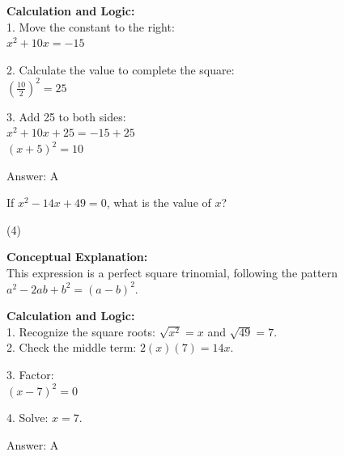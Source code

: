 \documentclass[11pt,paper=a4,answers]{exam}
\begin{document}
\begin{questions}
\begin{solution}
\textbf{Calculation and Logic:} \\
1. Move the constant to the right: \\
   $x^2 + 10x = -15$

\vspace{10pt}

2. Calculate the value to complete the square: \\
   $(\frac{10}{2})^2 = 25$

\vspace{10pt}

3. Add 25 to both sides: \\
   $x^2 + 10x + 25 = -15 + 25$ \\
   $(x + 5)^2 = 10$

\vspace{20pt}

Answer: \colorbox{yellow!100}{A}
\end{solution}

\vspace{30pt}

\question
If $x^2 - 14x + 49 = 0$, what is the value of $x$?
\begin{tasks}(4)
\end{tasks}

\begin{solution}
\textbf{Conceptual Explanation:} \\
This expression is a perfect square trinomial, following the pattern $a^2 - 2ab + b^2 = (a - b)^2$.

\vspace{15pt}

\textbf{Calculation and Logic:} \\
1. Recognize the square roots: $\sqrt{x^2} = x$ and $\sqrt{49} = 7$. \\
2. Check the middle term: $2(x)(7) = 14x$.

\vspace{10pt}

3. Factor: \\
   $(x - 7)^2 = 0$

\vspace{10pt}

4. Solve: $x = 7$.

\vspace{20pt}

Answer: \colorbox{yellow!100}{A}
\end{solution}


\end{questions}
\end{document}
